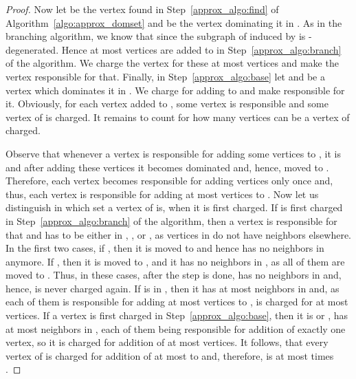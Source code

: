 \begin{proof}
Now let  be the vertex found in Step~\ref{approx_algo:find} of Algorithm~\ref{algo:approx_domset} and  be the vertex dominating it in . As in the branching algorithm, we know that  since the subgraph of  induced by  is -degenerated. Hence at most  vertices are added to  in Step~\ref{approx_algo:branch} of the algorithm. We charge the vertex  for these at most  vertices and make the vertex  responsible for that. Finally, in Step~\ref{approx_algo:base} let  and  be a vertex which dominates it in . We charge  for adding  to  and make  responsible for it. Obviously, for each vertex added to , some vertex is responsible and some vertex of  is charged. It remains to count for how many vertices can be a vertex of  charged. 

Observe that whenever a vertex is responsible for adding some vertices to , it is  and after adding these vertices it becomes dominated and, hence, moved to . Therefore, each vertex becomes responsible for adding vertices only once and, thus, each vertex is responsible for adding at most  vertices to . Now let us distinguish in which set a vertex  of  is, when it is first charged. If  is first charged in Step~\ref{approx_algo:branch} of the algorithm, then a vertex  is responsible for that and  has to be either in , , or , as vertices in  do not have neighbors elsewhere. In the first two cases, if , then it is moved to  and hence has no neighbors in  anymore. If , then it is moved to , and it has no neighbors in , as all of them are moved to . Thus, in these cases, after the step is done,  has no neighbors in  and, hence, is never charged again. If  is in , then it has at most  neighbors in  and, as each of them is responsible for adding at most  vertices to ,  is charged for at most  vertices. If a vertex  is first charged in Step~\ref{approx_algo:base}, then it is  or , has at most  neighbors in , each of them being responsible for addition of exactly one vertex, so it is charged for addition of at most  vertices. It follows, that every vertex of  is charged for addition of at most  to  and, therefore,  is at most  times .


\end{proof}
